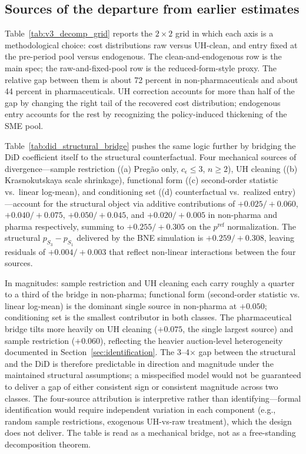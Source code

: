 \subsection{Sources of the departure from earlier estimates}\label{sec:bridge}

Table~\ref{tab:v3_decomp_grid} reports the $2 \times 2$ grid in which each axis is a methodological choice: cost distributions raw versus UH-clean, and entry fixed at the pre-period pool versus endogenous. The clean-and-endogenous row is the main spec; the raw-and-fixed-pool row is the reduced-form-style proxy. The relative gap between them is about 72 percent in non-pharmaceuticals and about 44 percent in pharmaceuticals. UH correction accounts for more than half of the gap by changing the right tail of the recovered cost distribution; endogenous entry accounts for the rest by recognizing the policy-induced thickening of the SME pool.

Table~\ref{tab:did_structural_bridge} pushes the same logic further by bridging the DiD coefficient itself to the structural counterfactual. Four mechanical sources of divergence---sample restriction ((a) Preg\~ao only, $c_\epsilon \le 3$, $n \ge 2$), UH cleaning ((b) Krasnokutskaya scale shrinkage), functional form ((c) second-order statistic vs.\ linear log-mean), and conditioning set ((d) counterfactual vs.\ realized entry)---account for the structural object via additive contributions of $+0.025/+0.060$, $+0.040/+0.075$, $+0.050/+0.045$, and $+0.020/+0.005$ in non-pharma and pharma respectively, summing to $+0.255/+0.305$ on the $p^{\mathrm{ref}}$ normalization. The structural $p_{S_3} - p_{S_1}$ delivered by the BNE simulation is $+0.259/+0.308$, leaving residuals of $+0.004/+0.003$ that reflect non-linear interactions between the four sources.

In magnitudes: sample restriction and UH cleaning each carry roughly a quarter to a third of the bridge in non-pharma; functional form (second-order statistic vs. linear log-mean) is the dominant single source in non-pharma at $+0.050$; conditioning set is the smallest contributor in both classes. The pharmaceutical bridge tilts more heavily on UH cleaning ($+0.075$, the single largest source) and sample restriction ($+0.060$), reflecting the heavier auction-level heterogeneity documented in Section~\ref{sec:identification}. The 3--4$\times$ gap between the structural and the DiD is therefore predictable in direction and magnitude under the maintained structural assumptions; a misspecified model would not be guaranteed to deliver a gap of either consistent sign or consistent magnitude across two classes. The four-source attribution is interpretive rather than identifying---formal identification would require independent variation in each component (e.g., random sample restrictions, exogenous UH-vs-raw treatment), which the design does not deliver. The table is read as a mechanical bridge, not as a free-standing decomposition theorem.

